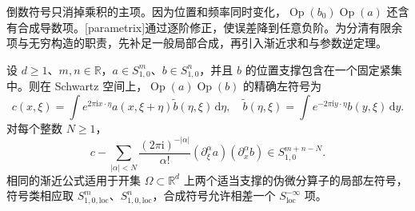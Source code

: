 倒数符号只消掉乘积的主项。因为位置和频率同时变化，\(\operatorname{Op}(b_0)\operatorname{Op}(a)\) 还含有合成导数项。[parametrix]通过逐阶修正，使误差降到任意负阶。为分清有限余项与无穷构造的职责，先补足一般局部合成，再引入渐近求和与参数逆定理。

\begin{proposition}[局部符号的有限合成]
\label{b2:prop:G-local-composition}
设 \(d\ge1\)、\(m,n\in\mathbb R\)，\(a\in S^m_{1,0}\)、\(b\in S^n_{1,0}\)，并且 \(b\) 的位置支撑包含在一个固定紧集中。则在 Schwartz 空间上，\(\operatorname{Op}(a)\operatorname{Op}(b)\) 的精确左符号为
\[
 c(x,\xi)=\int e^{2\pi\mathrm ix\cdot\eta}
                   a(x,\xi+\eta)\widetilde b(\eta,\xi)\,\mathrm d\eta,
 \quad
 \widetilde b(\eta,\xi)=\int e^{-2\pi\mathrm iy\cdot\eta}
                   b(y,\xi)\,\mathrm dy.
\]
对每个整数 \(N\ge1\)，
\[
 c-\sum_{|\alpha|<N}
       \frac{(2\pi\mathrm i)^{-|\alpha|}}{\alpha!}
       (\partial_\xi^\alpha a)(\partial_x^\alpha b)
 \in S^{m+n-N}_{1,0}.
\]
相同的渐近公式适用于开集 \(\Omega\subset\mathbb R^d\) 上两个适当支撑的伪微分算子的局部左符号，符号类相应取 \(S^m_{1,0,\mathrm{loc}}\)、\(S^n_{1,0,\mathrm{loc}}\)，合成符号允许相差一个 \(S^{-\infty}_{\mathrm{loc}}\) 项。
\end{proposition}
